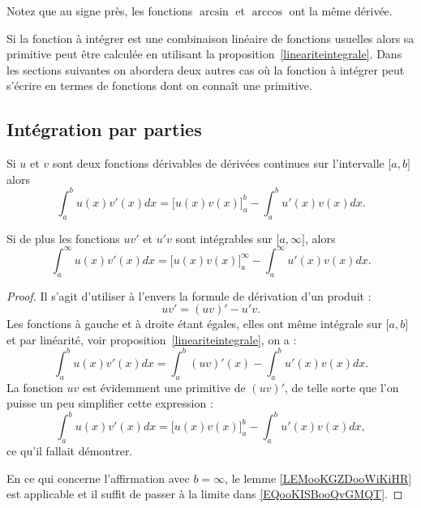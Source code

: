 Notez que au signe près, les fonctions \( \arcsin \) et \( \arccos\) ont la même dérivée.

Si la fonction à intégrer est une combinaison linéaire de fonctions usuelles alors sa primitive peut \^etre calculée en utilisant la proposition~\ref{lineariteintegrale}. Dans les sections suivantes on abordera deux autres cas où la fonction à intégrer peut s'écrire en termes de fonctions dont on connaît une primitive.

\subsection{Intégration par parties}

\begin{proposition}     \label{PROPooRLFIooQHnyJY}
	Si \( u\) et \( v\) sont deux fonctions dérivables de dérivées continues sur l'intervalle \( \mathopen[ a , b \mathclose]\) alors
	\begin{equation}        \label{EQooKISBooQvGMQT}
		\int_a^b u(x)v'(x)dx=\big[ u(x)v(x) \big]_a^b-\int_a^bu'(x)v(x)dx.
	\end{equation}

	Si de plus les fonctions \( uv'\) et \( u'v\) sont intégrables sur \( \mathopen[ a , \infty \mathclose]\), alors
	\begin{equation}
		\int_a^{\infty} u(x)v'(x)dx=\big[ u(x)v(x) \big]_a^{\infty}-\int_a^{\infty}u'(x)v(x)dx.
	\end{equation}
\end{proposition}

\begin{proof}
	Il s'agit d'utiliser à l'envers la formule de dérivation d'un produit :
	\begin{equation}
		uv'=(uv)'-u'v.
	\end{equation}
	Les fonctions à gauche et à droite étant égales, elles ont même intégrale sur \( \mathopen[ a , b \mathclose]\) et par linéarité, voir  proposition~\ref{lineariteintegrale}, on a :
	\begin{equation}
		\int_a^b u(x)v'(x)dx=\int_a^b (uv)'(x)-\int_a^b u'(x)v(x)dx.
	\end{equation}
	La fonction \( uv\) est évidemment une primitive de \( (uv)'\), de telle sorte que l'on puisse un peu simplifier cette expression :
	\begin{equation}
		\int_a^b u(x)v'(x)dx= \Big[ u(x)v(x) \Big]_a^b -\int_a^b u'(x)v(x)dx,
	\end{equation}
	ce qu'il fallait démontrer.

	En ce qui concerne l'affirmation avec \( b=\infty\), le lemme \ref{LEMooKGZDooWiKiHR} est applicable et il suffit de passer à la limite dans \eqref{EQooKISBooQvGMQT}.
\end{proof}

